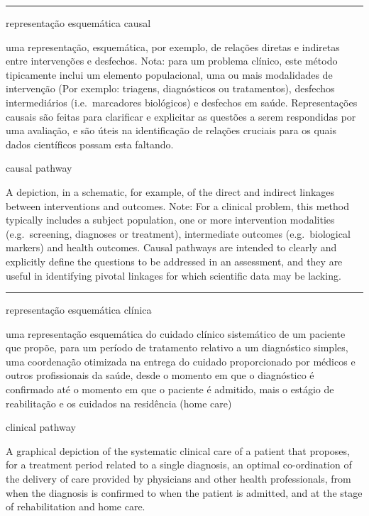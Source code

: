 \documentclass[
]{book}
\begin{document}
\begin{center}\rule{0.5\linewidth}{0.5pt}\end{center}

representação esquemática causal

uma representação, esquemática, por exemplo, de relações diretas e indiretas entre intervenções e desfechos. Nota: para um problema clínico, este método tipicamente inclui um elemento populacional, uma ou mais modalidades de intervenção (Por exemplo: triagens, diagnósticos ou tratamentos), desfechos intermediários (i.e.~marcadores biológicos) e desfechos em saúde. Representações causais são feitas para clarificar e explicitar as questões a serem respondidas por uma avaliação, e são úteis na identificação de relações cruciais para os quais dados científicos possam esta faltando.

causal pathway

A depiction, in a schematic, for example, of the direct and indirect linkages between interventions and outcomes. Note: For a clinical problem, this method typically includes a subject population, one or more intervention modalities (e.g.~screening, diagnoses or treatment), intermediate outcomes (e.g.~biological markers) and health outcomes. Causal pathways are intended to clearly and explicitly define the questions to be addressed in an assessment, and they are useful in identifying pivotal linkages for which scientific data may be lacking.

\begin{center}\rule{0.5\linewidth}{0.5pt}\end{center}

representação esquemática clínica

uma representação esquemática do cuidado clínico sistemático de um paciente que propõe, para um período de tratamento relativo a um diagnóstico simples, uma coordenação otimizada na entrega do cuidado proporcionado por médicos e outros profissionais da saúde, desde o momento em que o diagnóstico é confirmado até o momento em que o paciente é admitido, mais o estágio de reabilitação e os cuidados na residência (home care)

clinical pathway

A graphical depiction of the systematic clinical care of a patient that proposes, for a treatment period related to a single diagnosis, an optimal co-ordination of the delivery of care provided by physicians and other health professionals, from when the diagnosis is confirmed to when the patient is admitted, and at the stage of rehabilitation and home care.
\end{document}
